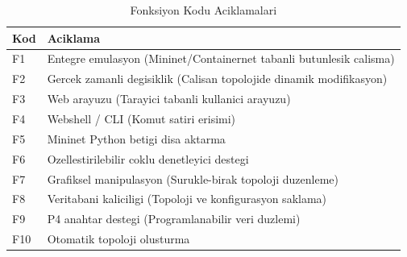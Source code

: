 \documentclass[conference]{IEEEtran}
\begin{document}
\begin{table}[htbp]
\caption{Fonksiyon Kodu Aciklamalari}
\label{tab:functions}
\centering
\small
\begin{tabularx}{\linewidth}{l Y}
\toprule
\textbf{Kod} & \textbf{Aciklama} \\
\midrule
F1 & Entegre emulasyon (Mininet/Containernet tabanli butunlesik calisma) \\
F2 & Gercek zamanli degisiklik (Calisan topolojide dinamik modifikasyon) \\
F3 & Web arayuzu (Tarayici tabanli kullanici arayuzu) \\
F4 & Webshell / CLI (Komut satiri erisimi) \\
F5 & Mininet Python betigi disa aktarma \\
F6 & Ozellestirilebilir coklu denetleyici destegi \\
F7 & Grafiksel manipulasyon (Surukle-birak topoloji duzenleme) \\
F8 & Veritabani kaliciligi (Topoloji ve konfigurasyon saklama) \\
F9 & P4 anahtar destegi (Programlanabilir veri duzlemi) \\
F10 & Otomatik topoloji olusturma \\
\bottomrule
\end{tabularx}
\end{table}
\end{document}
